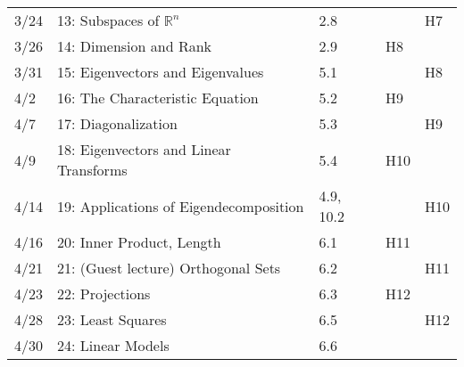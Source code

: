 \documentclass[11pt]{article}
\begin{document}
\begin{centering}
\begin{tabular}{||l|p{3in}|l|l|l||}
3/24 & 13: Subspaces of $\mathbb{R}^n$ & 2.8 & & H7\\ 
3/26 & 14: Dimension and Rank & 2.9 & H8 &\\ 
\hline

3/31 & 15: Eigenvectors and Eigenvalues & 5.1 &  & H8\\ 
4/2 & 16: The Characteristic Equation & 5.2 & H9 &\\ 
\hline

4/7 & 17: Diagonalization & 5.3 & & H9\\ 
4/9 & 18: Eigenvectors and Linear Transforms & 5.4 & H10 &\\
\hline

4/14 & 19: Applications of Eigendecomposition & 4.9, 10.2 & & H10\\ %
4/16 & 20: Inner Product, Length & 6.1 & H11 &\\ 
 \hline

4/21 & 21: (Guest lecture) Orthogonal Sets & 6.2 & & H11\\ 
4/23 & 22: Projections & 6.3 & H12 & \\
\hline

4/28 & 23: Least Squares & 6.5 & & H12\\ 
4/30 & 24: Linear Models & 6.6 &  &\\ 
\hline\hline

\end{tabular}\\
\end{centering}
\end{document}
